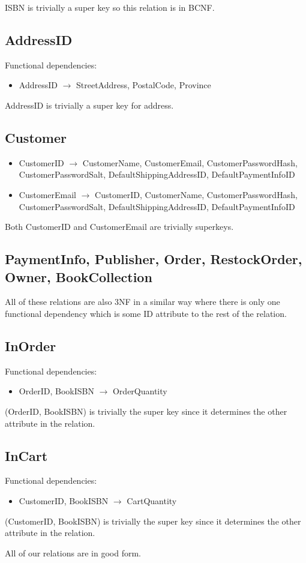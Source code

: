 \documentclass{article}
\newcommand{\trightarrow}{\(\rightarrow\)}
\begin{document}
ISBN is trivially a super key so this relation is in BCNF.

\subsection{AddressID}
Functional dependencies:
\begin{itemize}
  \item AddressID \trightarrow{} StreetAddress, PostalCode, Province
\end{itemize}

AddressID is trivially a super key for address.

\subsection{Customer}
\begin{itemize}
  \item CustomerID \trightarrow{} CustomerName, CustomerEmail, CustomerPasswordHash, CustomerPasswordSalt, DefaultShippingAddressID, DefaultPaymentInfoID
  \item CustomerEmail \trightarrow{} CustomerID, CustomerName, CustomerPasswordHash, CustomerPasswordSalt, DefaultShippingAddressID, DefaultPaymentInfoID
\end{itemize}

Both CustomerID and CustomerEmail are trivially superkeys.

\subsection{PaymentInfo, Publisher, Order, RestockOrder, Owner, BookCollection}
All of these relations are also 3NF in a similar way where there is only one functional dependency which is some ID attribute to the rest of the relation.

\subsection{InOrder}
Functional dependencies:
\begin{itemize}
  \item OrderID, BookISBN \trightarrow{} OrderQuantity
\end{itemize}

(OrderID, BookISBN) is trivially the super key since it determines the other attribute in the relation.

\subsection{InCart}
Functional dependencies:
\begin{itemize}
  \item CustomerID, BookISBN \trightarrow{} CartQuantity
\end{itemize}

(CustomerID, BookISBN) is trivially the super key since it determines the other attribute in the relation.

All of our relations are in good form.
\end{document}
